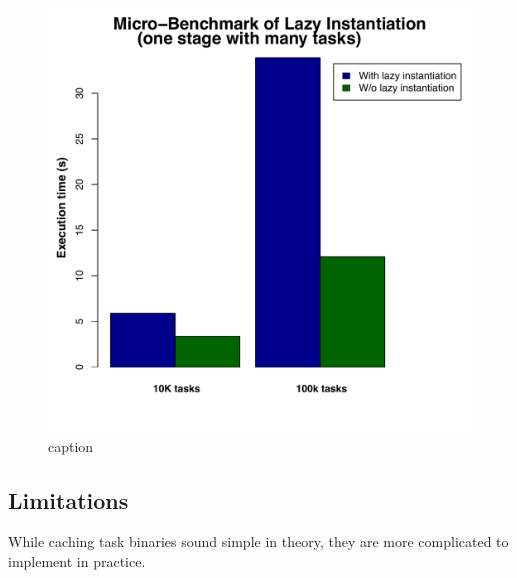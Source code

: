 \begin{figure}[t!]
 \begin{center}
   \includegraphics[scale=0.45]{images_graphs/optimizations/graph1/lazy_micro.pdf}
 \end{center}
 \caption{caption}
 \label{fig:lazy_micro}
\end{figure}

\subsection{Limitations}
While caching task binaries sound simple in theory, they are more complicated to implement in practice. 